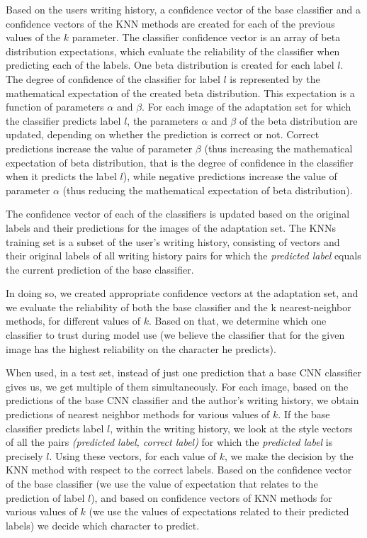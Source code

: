 \documentclass{article}
\begin{document}
Based on the users writing history, a confidence vector of the base classifier and a confidence vectors of the KNN methods are created for each of the previous values of the $k$ parameter.
The classifier confidence vector is an array of beta distribution expectations, which evaluate the reliability of the classifier when predicting each of the labels.
One beta distribution is created for each label $l$.
The degree of confidence of the classifier for label $l$ is represented by the mathematical expectation of the created beta distribution.
This expectation is a function of parameters $\alpha$  and $\beta$.
For each image of the adaptation set for which the classifier predicts label $l$, the parameters $\alpha$  and $\beta$ of the beta distribution are updated, depending on whether the prediction is correct or not.
Correct predictions increase the value of parameter $\beta$
(thus increasing the mathematical expectation of beta distribution, that is the degree of confidence in the classifier when it predicts the label $l$),
while negative predictions increase the value of parameter $\alpha$
(thus reducing the mathematical expectation of beta distribution).

The confidence vector of each of the classifiers is updated based on the original labels and their predictions for the images of the adaptation set.
The KNNs training set is a subset of the user's writing history, consisting of vectors and their original labels of all writing history pairs for
which the \textit{predicted label} equals the current prediction of the base classifier.

In doing so, we created appropriate confidence vectors at the adaptation set, and we evaluate the reliability of both the base classifier and the k nearest-neighbor methods, for different values of $k$.
Based on that, we determine which one classifier to trust during model use (we believe the classifier that for the given image has the highest reliability on the character he predicts).

When used, in a test set, instead of just one prediction that a base CNN classifier gives us, we get multiple of them simultaneously.
For each image, based on the predictions of the base CNN classifier and the author's writing history, we obtain predictions of nearest neighbor methods for various values of $k$.
If the base classifier predicts label $l$, within the writing history, we look at the style vectors of all the pairs \textit{(predicted label, correct label)} for which the \textit{predicted label} is precisely $l$.
Using these vectors, for each value of $k$, we make the decision by the KNN method with respect to the correct labels.
Based on the confidence vector of the base classifier (we use the value of expectation that relates to the prediction of label $l$), and based on confidence vectors of KNN methods for various values of $k$
(we use the values of expectations related to their predicted labels) we decide which character to predict.
\end{document}
